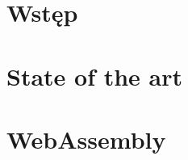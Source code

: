 \documentclass[language=polish,type=master]{aghmodern}
\author{Piotr Szczygieł}
\date{2022}
\begin{document}
\frontmatter
\maketitle
\tableofcontents

\mainmatter

\chapter{Wstęp}

\chapter{State of the art}



\chapter{WebAssembly}

\backmatter

\cleardoublepage
\listoffigures

\cleardoublepage
\listoftables

\cleardoublepage
\printbibliography
\end{document}
